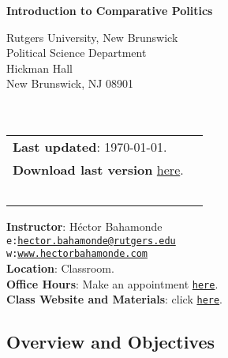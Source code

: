 \documentclass[letterpaper]{article}
\def\name{Introduction to Comparative Politics}
\begin{document}

\centerline{\huge \bf \name}

\vspace{0.25in}

\begin{minipage}{0.45\linewidth}
  Rutgers University, New Brunswick \\
  Political Science Department \\
  Hickman Hall \\
  New Brunswick, NJ 08901\\
  \\
  \\

\end{minipage}
\hspace{4cm}\begin{minipage}{0.45\linewidth}
  \begin{tabular}{ll}
{\bf Last updated}: \today. \\
 {\bf Download last version} \href{https://github.com/hbahamonde/Comparative_Politics_UGRAD/raw/master/Bahamonde_Comparative_Politics_Syllabus_UGRAD.pdf}{here}.\\
   {\bf {\color{red}{\scriptsize Not intended as a definitive version}}} %
    \\
    \\
    \\
    \\
    \\
  \end{tabular}
\end{minipage}

\vspace{-5mm}
{\bf Instructor}: H\'ector Bahamonde\\
\texttt{e:}\href{mailto:hector.bahamonde@rutgers.edu}{\texttt{hector.bahamonde@rutgers.edu}}\\
\texttt{w:}\href{http://www.hectorbahamonde.com}{\texttt{www.hectorbahamonde.com}}\\
{\bf Location}: Classroom.\\
{\bf Office Hours}: Make an appointment \href{https://calendly.com/bahamonde/officehours}{\texttt{here}}.\\
{\bf Class Website and Materials}: click \href{https://github.com/hbahamonde/Comparative_Politics_UGRAD}{\texttt{here}}.

\subsection*{Overview and Objectives}
\end{document}
